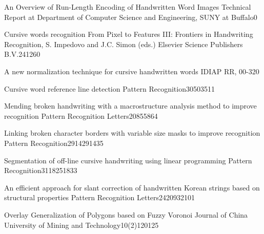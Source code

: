 {An Overview of Run-Length Encoding of Handwritten Word Images}
{Technical Report at Department of Computer Science and Engineering, SUNY at Buffalo}{}{0}{}

{Cursive words recognition}
{From Pixel to Features III: Frontiers in Handwriting Recognition, S. Impedovo and J.C. Simon (eds.) Elsevier Science Publishers B.V.}{}{241}{260}

{A new normalization technique for cursive handwritten words}
{IDIAP RR, 00-32}{}{0}{}

{Cursive word reference line detection}
{Pattern Recognition}{30}{503}{511}

{Mending broken handwriting with a macrostructure analysis method to improve recognition}
{Pattern Recognition Letters}{20}{855}{864}

{Linking broken character borders with variable size masks to improve recognition}
{Pattern Recognition}{29}{1429}{1435}

{Segmentation of off-line cursive handwriting using linear programming}
{Pattern Recognition}{31}{1825}{1833}

{An efficient approach for slant correction of handwritten Korean strings based on structural properties}
{Pattern Recognition Letters}{24}{2093}{2101}

{Overlay Generalization of Polygons based on Fuzzy Voronoi}
{Journal of China University of Mining and Technology}{10(2)}{120}{125}


